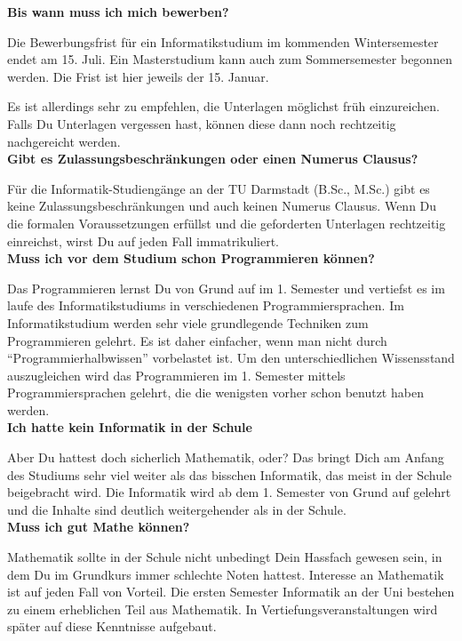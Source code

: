 {}
{\textbf{Bis wann muss ich mich bewerben?}

    Die Bewerbungsfrist für ein Informatikstudium im kommenden Wintersemester endet am 15. Juli. Ein Masterstudium kann auch zum Sommersemester begonnen werden. Die Frist ist hier jeweils der 15. Januar.

    Es ist allerdings sehr zu empfehlen, die Unterlagen möglichst früh einzureichen. Falls Du Unterlagen vergessen hast, können diese dann noch rechtzeitig nachgereicht werden.\\

    \textbf{Gibt es Zulassungsbeschränkungen oder einen Numerus Clausus?}

    Für die Informatik-Studiengänge an der TU Darmstadt (B.Sc., M.Sc.) gibt es keine Zulassungsbeschränkungen und auch keinen Numerus Clausus. Wenn Du die formalen Voraussetzungen erfüllst und die geforderten Unterlagen rechtzeitig einreichst, wirst Du auf jeden Fall immatrikuliert.\\

    \textbf{Muss ich vor dem Studium schon Programmieren können?}

    Das Programmieren lernst Du von Grund auf im 1. Semester und vertiefst es im laufe des Informatikstudiums in verschiedenen Programmiersprachen. Im Informatikstudium werden sehr viele grundlegende Techniken zum Programmieren gelehrt. Es ist daher einfacher, wenn man nicht durch "`Programmierhalbwissen"' vorbelastet ist. Um den unterschiedlichen Wissensstand auszugleichen wird das Programmieren im 1. Semester mittels Programmiersprachen gelehrt, die die wenigsten vorher schon benutzt haben werden.\\

    \textbf{Ich hatte kein Informatik in der Schule}

    Aber Du hattest doch sicherlich Mathematik, oder? Das bringt Dich am Anfang des Studiums sehr viel weiter als das bisschen Informatik, das meist in der Schule beigebracht wird. Die Informatik wird ab dem 1. Semester von Grund auf gelehrt und die Inhalte sind deutlich weitergehender als in der Schule.\\

    \textbf{Muss ich gut Mathe können?}

    Mathematik sollte in der Schule nicht unbedingt Dein Hassfach gewesen sein, in dem Du im Grundkurs immer schlechte Noten hattest. Interesse an Mathematik ist auf jeden Fall von Vorteil. Die ersten Semester Informatik an der Uni bestehen zu einem erheblichen Teil aus Mathematik. In Vertiefungsveranstaltungen wird später auf diese Kenntnisse aufgebaut.\\

}
